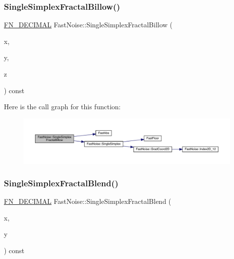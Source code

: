 \subsubsection{\texorpdfstring{Single\+Simplex\+Fractal\+Billow()}{SingleSimplexFractalBillow()}\hspace{0.1cm}{\footnotesize\ttfamily [2/2]}}
{\footnotesize\ttfamily \mbox{\hyperlink{_fast_noise_8h_a75a9ef6d2541c4921815b885bfd449c3}{F\+N\+\_\+\+D\+E\+C\+I\+M\+AL}} Fast\+Noise\+::\+Single\+Simplex\+Fractal\+Billow (\begin{DoxyParamCaption}\item[{\mbox{\hyperlink{_fast_noise_8h_a75a9ef6d2541c4921815b885bfd449c3}{F\+N\+\_\+\+D\+E\+C\+I\+M\+AL}}}]{x,  }\item[{\mbox{\hyperlink{_fast_noise_8h_a75a9ef6d2541c4921815b885bfd449c3}{F\+N\+\_\+\+D\+E\+C\+I\+M\+AL}}}]{y,  }\item[{\mbox{\hyperlink{_fast_noise_8h_a75a9ef6d2541c4921815b885bfd449c3}{F\+N\+\_\+\+D\+E\+C\+I\+M\+AL}}}]{z }\end{DoxyParamCaption}) const\hspace{0.3cm}{\ttfamily [private]}}

Here is the call graph for this function\+:
\nopagebreak
\begin{figure}[H]
\begin{center}
\leavevmode
\includegraphics[width=350pt]{d1/dd8/class_fast_noise_a6dd57ba17192a085544452db30caaf64_cgraph}
\end{center}
\end{figure}
\mbox{\label{class_fast_noise_af076ea4b492ce8e166816c5842ce43da}} 
\subsubsection{\texorpdfstring{Single\+Simplex\+Fractal\+Blend()}{SingleSimplexFractalBlend()}}
{\footnotesize\ttfamily \mbox{\hyperlink{_fast_noise_8h_a75a9ef6d2541c4921815b885bfd449c3}{F\+N\+\_\+\+D\+E\+C\+I\+M\+AL}} Fast\+Noise\+::\+Single\+Simplex\+Fractal\+Blend (\begin{DoxyParamCaption}\item[{\mbox{\hyperlink{_fast_noise_8h_a75a9ef6d2541c4921815b885bfd449c3}{F\+N\+\_\+\+D\+E\+C\+I\+M\+AL}}}]{x,  }\item[{\mbox{\hyperlink{_fast_noise_8h_a75a9ef6d2541c4921815b885bfd449c3}{F\+N\+\_\+\+D\+E\+C\+I\+M\+AL}}}]{y }\end{DoxyParamCaption}) const\hspace{0.3cm}{\ttfamily [private]}}

